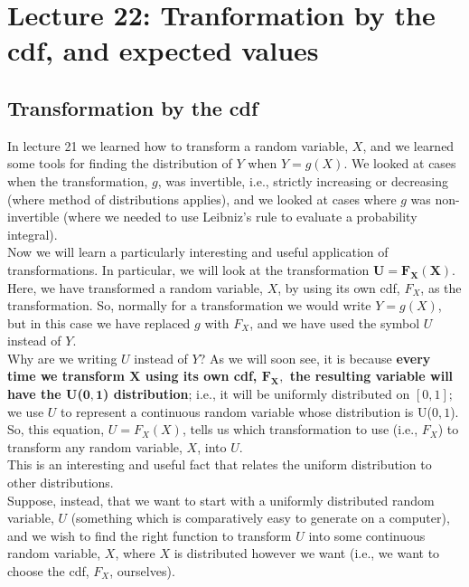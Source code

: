\chapter{Lecture 22: Tranformation by the cdf, and expected values}

\section{Transformation by the cdf} \label{U}
In lecture 21 we learned how to transform a random variable, $X$, and we learned some tools for finding the distribution of $Y$ when $Y = g(X)$. We looked at cases when the transformation, $g$, was invertible, i.e., strictly increasing or decreasing (where method of distributions applies), and we looked at cases where $g$ was non-invertible (where we needed to use Leibniz's rule to evaluate a probability integral). \\

\noindent Now we will learn a particularly interesting and useful application of transformations. In particular, we will look at the transformation $\boldsymbol{U = F_X(X)}$. Here, we have transformed a random variable, $X$, by using its own cdf, $F_X$, as the transformation. So, normally for a transformation we would write $Y = g(X)$, but in this case we have replaced $g$ with $F_X$, and we have used the symbol $U$ instead of $Y$. \\

\noindent Why are we writing $U$ instead of $Y$? As we will soon see, it is because \textbf{every time we transform $\boldsymbol{X}$ using its own cdf, $\boldsymbol{F_X,}$ the resulting variable will have the U($\boldsymbol{0,1}$) distribution}; i.e., it will be uniformly distributed on $[0,1];$ we use $U$ to represent a continuous random variable whose distribution is U($0,1$). \\

\noindent So, this equation, $U = F_X(X)$, tells us which transformation to use (i.e., $F_X$) to transform any random variable, $X$, into $U$.  \\

\noindent This is an interesting and useful fact that relates the uniform distribution to other distributions. \\

\noindent Suppose, instead, that we want to start with a uniformly distributed random variable, $U$ (something which is comparatively easy to generate on a computer), and we wish to find the right function to transform $U$ into some continuous random variable, $X$, where $X$ is distributed however we want (i.e., we want to choose the cdf, $F_X$, ourselves). \\

